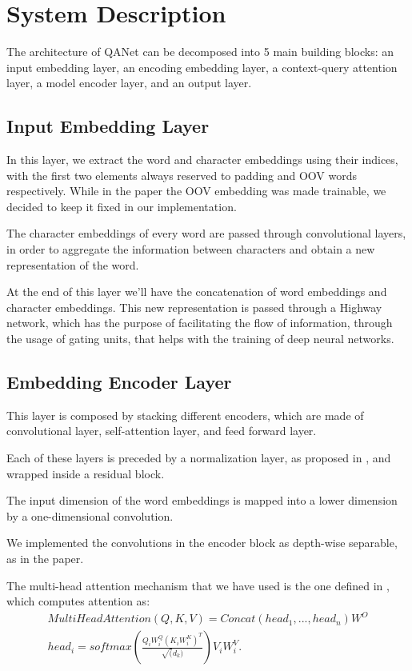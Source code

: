 \chapter{System Description} 
    The architecture of QANet can be decomposed into 5 main building blocks: an input embedding layer, 
    an encoding embedding layer, a context-query attention layer, a model encoder layer, and an output layer.

    \section{Input Embedding Layer}
        In this layer, we extract the word and character embeddings using their indices, with the first two elements always 
        reserved to padding and OOV words respectively.
        While in the paper the OOV embedding was made trainable, we decided to keep it fixed in our implementation.

        The character embeddings of every word are passed through convolutional layers, in order to aggregate the 
        information between characters and obtain a new representation of the word. 
        
        At the end of this layer we'll have the concatenation of word embeddings and character embeddings. 
        This new representation is passed through a Highway network\cite{srivastava2015highway}, which has the purpose of facilitating the 
        flow of information, through the usage of gating units, that helps with the training of deep neural networks.
    
    \section{Embedding Encoder Layer}
        This layer is composed by stacking different encoders, which are made of convolutional layer, self-attention layer, 
        and feed forward layer. 
        
        Each of these layers is preceded by a normalization layer, as proposed in \cite{ba2016layer}, and wrapped inside 
        a residual block. 
        
        The input dimension of the word embeddings is mapped into a lower dimension by a one-dimensional convolution.

        We implemented the convolutions in the encoder block as depth-wise separable, as in the paper. 
        
        The multi-head attention mechanism that we have used is the one defined in \cite{vaswani2017attention}, which computes attention as:
        \begin{gather*}
            MultiHeadAttention(Q,K,V) = Concat(head_{1},...,head_{n}) W^{O}\\
            head_{i} = softmax(\frac{Q_{i}W_{i}^{Q} (K_{i}W_{i}^{K})^{T}}{\sqrt(d_{k})}) V_{i} W_{i}^{V}.
        \end{gather*}
        
